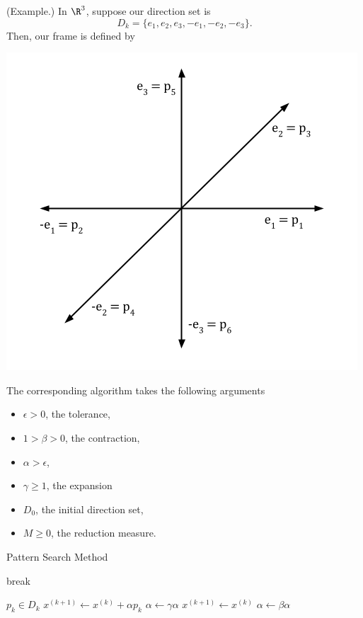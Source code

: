 \documentclass[letterpaper]{article}
\begin{document}
\begin{mdframed}
    (Example.) In $\R^3$, suppose our direction set is \[D_{k} = \{e_1, e_2, e_3, -e_1, -e_2, -e_3\}.\] Then, our frame is defined by 
    \begin{center}
        \includegraphics[scale=0.5]{../assets/coordinate_descent.png}
    \end{center}
\end{mdframed}
The corresponding algorithm takes the following arguments
\begin{itemize}
    \item $\epsilon > 0$, the tolerance,
    \item $1 > \beta > 0$, the contraction, 
    \item $\alpha > \epsilon$, 
    \item $\gamma \geq 1$, the expansion 
    \item $D_0$, the initial direction set,
    \item $M \geq 0$, the reduction measure.  
\end{itemize}

\begin{algorithm}[H]
    \caption{Pattern Search Method}
    \begin{algorithmic}[1]
                \If{$\alpha \leq \epsilon$}
                    \State break 
                \EndIf 

                    \State $p_k \in D_k$ 
                    \State $x^{({k + 1})} \gets x^{(k)} + \alpha p_{k}$ 
                    \State $\alpha \gets \gamma \alpha$
                \Else 
                    \State $x^{(k + 1)} \gets x^{(k)}$
                    \State $\alpha \gets \beta \alpha$
                \EndIf 
            \EndFor 
        \EndFunction 
    \end{algorithmic}
\end{algorithm}
\end{document}
